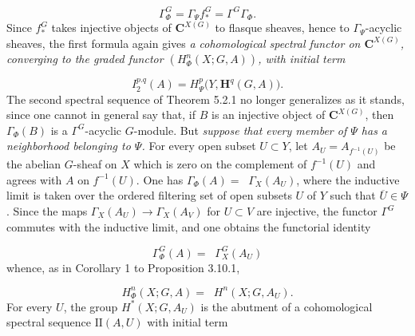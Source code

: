 \clearpage
{}

\begin{equation}
\Gamma_\Phi^G=\Gamma_\Psi f_*^G=\Gamma^G\Gamma_\Phi.
\tag{5.7.3}
\end{equation}
Since $f_*^G$ takes injective objects of ${\mathbf C}^{X(G)}$ to flasque sheaves, hence
to $\Gamma_\Psi$-acyclic sheaves, the first formula again gives \textit{a
cohomological spectral functor on ${\mathbf C}^{X(G)}$, converging to the graded functor
$(H_\Phi^n(X;G,A))$, with initial term}

\begin{equation}
I_2^{p.q}(A)=H_\Psi^p\bigl(Y,\mathbf H^q(G,A)\bigr).
\tag{5.7.4}
\end{equation}
The second spectral sequence of Theorem 5.2.1 no longer generalizes as it
stands, since one cannot in general say that, if $B$ is an injective object of
${\mathbf C}^{X(G)}$, then $\Gamma_\Phi(B)$ is a $\Gamma^G$-acyclic $G$-module. But
\textit{suppose that every member of $\Psi$ has a neighborhood belonging to
$\Psi$.}
For every open subset $U\subset Y$, let $A_U=A_{f^{-1}(U)}$ be the abelian
$G$-sheaf on $X$ which is zero on the complement of $f^{-1}(U)$ and agrees
with $A$ on $f^{-1}(U)$. One has
$\Gamma_\Phi(A)=\mathop{\underset{\to}{\lim}}\Gamma_X(A_U)$, where the inductive limit is
taken over the ordered filtering set of open subsets $U$ of $Y$ such that
$\overline U\in\Psi$. Since the maps
$\Gamma_X(A_U)\to\Gamma_X(A_V)$ for $U\subset V$ are injective, the functor
$\Gamma^G$ commutes with the inductive limit, and one obtains the
functorial identity

\begin{equation}
\Gamma_\Phi^G(A)=\mathop{\underset{\to}{\lim.}}\Gamma_X^G(A_U)
\tag{5.7.5}
\end{equation}
whence, as in Corollary 1 to Proposition 3.10.1,

\begin{equation}
H_\Phi^n(X;G,A)=\mathop{\underset{\to}{\lim}} H^n(X;G,A_U).
\tag{5.7.6}
\end{equation}
For every $U$, the group $H^*(X;G,A_U)$ is the abutment of a cohomological
spectral sequence $\mathrm {II}(A,U)$ with initial term

